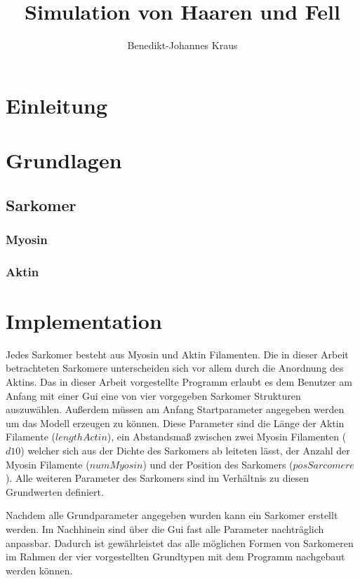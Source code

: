 \documentclass[a4paper,m]{cgBA}
\title{Simulation von Haaren und Fell}
\author{Benedikt-Johannes Kraus}
\begin{document}
\maketitle

\tableofcontents
\clearpage
{}


\section{Einleitung}

\section{Grundlagen}

\subsection{Sarkomer}

\subsubsection{Myosin}

\subsubsection{Aktin}

\section{Implementation}
Jedes Sarkomer besteht aus Myosin und Aktin Filamenten.
Die in dieser Arbeit betrachteten Sarkomere unterscheiden sich vor allem durch die Anordnung des Aktins. 
Das in dieser Arbeit vorgestellte Programm erlaubt es dem Benutzer am Anfang mit einer Gui eine von vier vorgegeben Sarkomer Strukturen auszuwählen. Außerdem müssen am Anfang Startparameter  angegeben werden um das Modell erzeugen zu können. Diese Parameter sind die Länge der Aktin Filamente (\(lengthActin\)), ein Abstandsmaß zwischen zwei Myosin Filamenten (\(d10\)) welcher sich aus der Dichte des Sarkomers ab leiteten lässt, der Anzahl der Myosin Filamente (\(numMyosin\)) und der Position des Sarkomers (\(posSarcomere\)). Alle weiteren Parameter des Sarkomers sind im Verhältnis zu diesen Grundwerten definiert.

Nachdem alle Grundparameter angegeben wurden kann ein Sarkomer erstellt werden. Im Nachhinein sind über die Gui fast alle Parameter nachträglich anpassbar. Dadurch ist gewährleistet das alle möglichen Formen von Sarkomeren im Rahmen der vier vorgestellten Grundtypen mit dem Programm nachgebaut werden können.  
\end{document}
